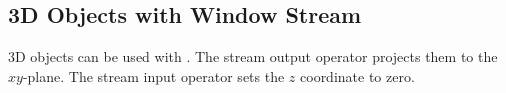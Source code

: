 \subsection{3D Objects with Window Stream}

3D objects can be used with . The stream output
operator \ccc{<<} projects them to the $xy$-plane. The stream input
operator \ccc{>>} sets the $z$ coordinate to zero.


